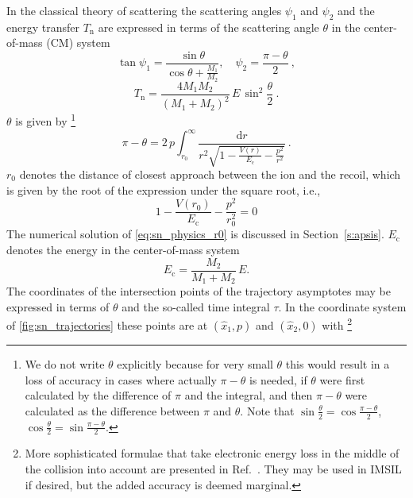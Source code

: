 In the classical theory of scattering \cite{Bohr1948,ZBL85} the scattering angles $\psi_1$ and $\psi_2$ and the energy transfer $T_\mathrm{n}$ are expressed in terms of the scattering angle $\theta$ in the center-of-mass (CM) system
%
\begin{equation}
    \label{eq:sn_physics_psi}
    \tan \psi_1 = \frac{ \sin\theta }{ \cos\theta + \frac{M_1}{M_2} }, \quad
    \psi_2 = \frac{\pi - \theta}{2} ~,
\end{equation}
%
\begin{equation}\label{eq:sn_physics_dE}
    T_\mathrm{n} = \frac{ 4 M_1 M_2 }{ (M_1 + M_2)^2 } \, E \,
        \sin^2 \frac{\theta}{2} ~.
\end{equation}
%
$\theta$ is given by \cite{Lan90}%
%
\footnote{We do not write $\theta$ explicitly because for very small $\theta$ this would result in a loss of accuracy in cases where actually $\pi - \theta$ is needed, if $\theta$ were first calculated by the difference of $\pi$ and the integral, and then $\pi - \theta$ were calculated as the difference between $\pi$ and $\theta$. Note that $\sin \frac{\theta}{2} = \cos \frac{\pi - \theta}{2}$, $\cos \frac{\theta}{2} = \sin \frac{\pi - \theta}{2}$.}
%
\begin{equation}
    \label{eq:sn_physics_theta}
    \pi - \theta = 2 \, p \int_{r_0}^\infty
        \frac{ \mathrm{d}r }{
            r^2 \sqrt{ 1 - \frac{ V(r) }{ E_\mathrm{c} } - \frac{ p^2 }{ r^2 } } } ~.
\end{equation}
%
$r_0$ denotes the distance of closest approach between the ion and the recoil, which is given by the root of the expression under the square root, i.e.,
%
\begin{equation}
    \label{eq:sn_physics_r0}
    1 - \frac{ V(r_0) }{ E_\mathrm{c} } - \frac{ p^2 }{ r_0^2 } = 0
\end{equation}
%
The numerical solution of \cref{eq:sn_physics_r0} is discussed in Section~\ref{s:apsis}.
$E_\mathrm{c}$ denotes the energy in the center-of-mass system
%
\begin{equation}
    \label{eq:sn_physics_Ec}
    E_\mathrm{c} = \frac{ M_2 }{ M_1 + M_2 } \, E .
\end{equation}
%
The coordinates of the intersection points of the trajectory asymptotes may be expressed in terms of $\theta$ and the so-called time integral $\tau$. In the coordinate system of \cref{fig:sn_trajectories} these points are at $(\hat{x}_1,p)$ and $(\hat{x}_2,0)$ with%
%
\footnote{
    More sophisticated formulae that take electronic energy loss in the middle of the collision into account are presented in Ref.~\cite{Eck91}.
    They may be used in IMSIL if desired, but the added accuracy is deemed marginal.
}
